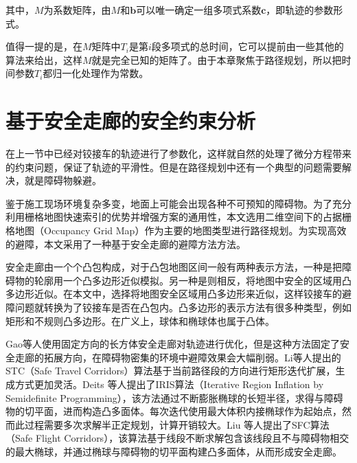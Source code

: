 \documentclass[master,academic]{ysuthesis} %
\begin{document}
		其中，$M$为系数矩阵，由$M$和$\mathbf{b}$可以唯一确定一组多项式系数$\mathbf{c}$，即轨迹的参数形式。

		值得一提的是，在$M$矩阵中$T_i$是第$i$段多项式的总时间，它可以提前由一些其他的算法来给出，这样$M$就是完全已知的矩阵了。由于本章聚焦于路径规划，所以把时间参数$T_i$都归一化处理作为常数。
	
	\section{基于安全走廊的安全约束分析}
	在上一节中已经对铰接车的轨迹进行了参数化，这样就自然的处理了微分方程带来的约束问题，保证了轨迹的平滑性。但是在路径规划中还有一个典型的问题需要解决，就是障碍物躲避。
	
	鉴于施工现场环境复杂多变，地面上可能会出现各种不可预知的障碍物。为了充分利用栅格地图快速索引的优势并增强方案的通用性，本文选用二维空间下的占据栅格地图（Occupancy Grid Map）作为主要的地图类型进行路径规划。为实现高效的避障，本文采用了一种基于安全走廊的避障方法方法。
	
	安全走廊由一个个凸包构成，对于凸包地图区间一般有两种表示方法，一种是把障碍物的轮廓用一个凸多边形近似模拟。另一种是则相反，将地图中安全的区域用凸多边形近似。在本文中，选择将地图安全区域用凸多边形来近似，这样铰接车的避障问题就转换为了铰接车是否在凸包内。凸多边形的表示方法有很多种类型，例如矩形和不规则凸多边形。在广义上，球体和椭球体也属于凸体。
	
	Gao等人使用固定方向的长方体安全走廊对轨迹进行优化，但是这种方法固定了安全走廊的拓展方向，在障碍物密集的环境中避障效果会大幅削弱。Li等人提出的STC（Safe Travel Corridors）算法基于当前路径段的方向进行矩形迭代扩展，生成方式更加灵活。Deits 等人提出了IRIS算法（Iterative Region Inflation by Semidefinite Programming），该方法通过不断膨胀椭球的长短半径，求得与障碍物的切平面，进而构造凸多面体。每次迭代使用最大体积内接椭球作为起始点，然而此过程需要多次求解半正定规划，计算开销较大。Liu 等人提出了SFC算法（Safe Flight Corridors），该算法基于线段不断求解包含该线段且不与障碍物相交的最大椭球，并通过椭球与障碍物的切平面构建凸多面体，从而形成安全走廊。
	
\end{document}
